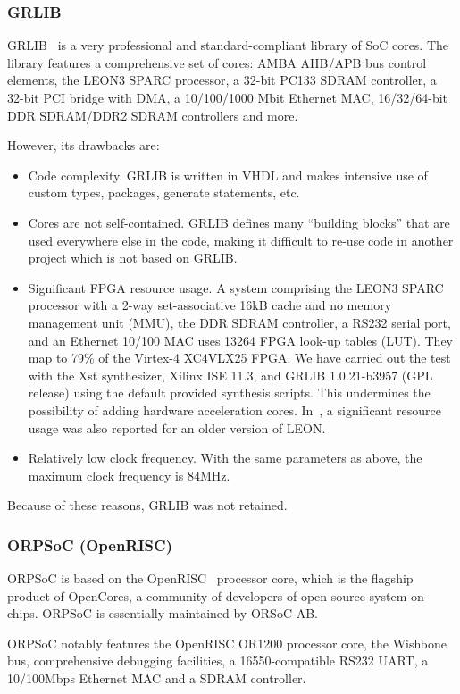\documentclass[a4paper,11pt]{kthesis}
\begin{document}
\subsubsection{GRLIB}
GRLIB~\cite{grlib} is a very professional and standard-compliant library of SoC cores. The library features a comprehensive set of cores: AMBA AHB/APB bus control elements, the LEON3 SPARC processor, a 32-bit PC133 SDRAM controller, a 32-bit PCI bridge with DMA, a 10/100/1000 Mbit Ethernet MAC,  16/32/64-bit DDR SDRAM/DDR2 SDRAM controllers and more.

However, its drawbacks are:
\begin{itemize}
\item Code complexity. GRLIB is written in VHDL and makes intensive use of custom types, packages, generate statements, etc.
\item Cores are not self-contained. GRLIB defines many ``building blocks'' that are used everywhere else in the code, making it difficult to re-use code in another project which is not based on GRLIB.
\item Significant FPGA resource usage. A system comprising the LEON3 SPARC processor with a 2-way set-associative 16kB cache and no memory management unit (MMU), the DDR SDRAM controller, a RS232 serial port, and an Ethernet 10/100 MAC uses 13264 FPGA look-up tables (LUT). They map to 79\% of the Virtex-4 XC4VLX25 FPGA. We have carried out the test with the Xst synthesizer, Xilinx ISE 11.3, and GRLIB 1.0.21-b3957 (GPL release) using the default provided synthesis scripts. This undermines the possibility of adding hardware acceleration cores. In~\cite{softcorecomp}, a significant resource usage was also reported for an older version of LEON.
\item Relatively low clock frequency. With the same parameters as above, the maximum clock frequency is 84MHz.
\end{itemize}

Because of these reasons, GRLIB was not retained.

\subsubsection{ORPSoC (OpenRISC)}
ORPSoC is based on the OpenRISC~\cite{openrisc} processor core, which is the flagship product of OpenCores, a community of developers of open source system-on-chips. ORPSoC is essentially maintained by ORSoC AB.

ORPSoC notably features the OpenRISC OR1200 processor core, the Wishbone~\cite{wishbone} bus, comprehensive debugging facilities, a 16550-compatible RS232 UART, a 10/100Mbps Ethernet MAC and a SDRAM controller.
\end{document}
